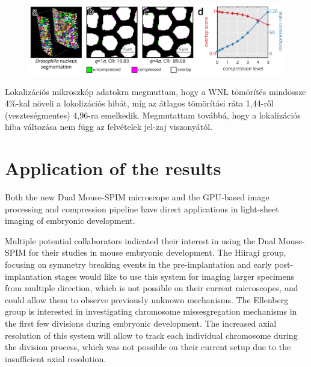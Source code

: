\documentclass{booklet_style}
\begin{document}
    \begin{figure}
      \centering
      \includegraphics[page=1,width=\textwidth]{4_gpu/LLvsB3D}
      \label{fig:wnlDroso}
    \end{figure}

    Lokalizációs mikroszkóp adatokra megmuttam, hogy a WNL tömörítés mindössze 4\%-kal növeli a lokolizációs hibát, míg az átlagos tömörítási ráta 1,44-ről (veszteségmentes) 4,96-ra emelkedik. Megmutattam továbbá, hogy a lokalizációs hiba változása nem függ az felvételek jel-zaj viszonyától.

    


\section{Application of the results}
  Both the new Dual Mouse-SPIM microscope and the GPU-based image processing and compression pipeline have direct applications in light-sheet imaging of embryonic development.

  Multiple potential collaborators indicated their interest in using the Dual Mouse-SPIM for their studies in mouse embryonic development. The Hiiragi group, focusing on symmetry breaking events in the pre-implantation and early post-implantation stages would like to use this system for imaging larger specimens from multiple direction, which is not possible on their current microscopes, and could allow them to observe previously unknown mechanisms. The Ellenberg group is interested in investigating chromosome missesgregation mechanisms in the first few divisions during embryonic development. The increased axial resolution of this system will allow to track each individual chromosome during the division process, which was not possible on their current setup due to the insufficient axial resolution.
\end{document}
